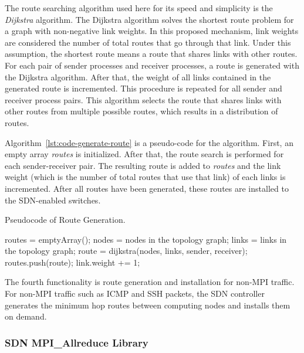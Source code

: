 The route searching algorithm used here for its speed and simplicity is
the \emph{Dijkstra} algorithm. The Dijkstra
algorithm solves the shortest route problem for a graph with
non-negative link weights. In this proposed mechanism, link weights are
considered the number of total routes that go through that link. Under
this assumption, the shortest route means a route that shares links with
other routes. For each pair of sender processes and receiver processes,
a route is generated with the Dijkstra algorithm. After that, the weight
of all links contained in the generated route is incremented. This
procedure is repeated for all sender and receiver process pairs. This
algorithm selects the route that shares links with other routes from
multiple possible routes, which results in a distribution of routes.

Algorithm~\ref{lst:code-generate-route} is a pseudo-code for the algorithm.
First, an empty array \emph{routes} is initialized. After that, the
route search is performed for each sender-receiver pair. The resulting
route is added to \emph{routes} and the link weight (which is the number
of total routes that use that link) of each links is incremented. After
all routes have been generated, these routes are installed to the
SDN-enabled switches.

\begin{algorithm}
    \caption{Pseudocode of Route Generation.}%
    \label{lst:code-generate-route}
    \begin{algorithmic}
        \STATE routes = emptyArray();
        \STATE nodes = nodes in the topology graph;
        \STATE links = links in the topology graph;
            \STATE route = dijkstra(nodes, links, sender, receiver);
            \STATE routes.push(route);
                \STATE link.weight += 1;
            \ENDFOR
        \ENDFOR
    \end{algorithmic}
\end{algorithm}

The fourth functionality is route generation and installation for
non-MPI traffic. For non-MPI traffic such as ICMP and SSH packets, the
SDN controller generates the minimum hop routes between computing nodes
and installs them on demand.

\subsubsection{SDN MPI\_Allreduce Library}

